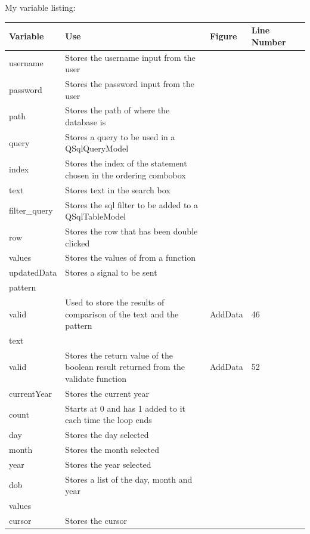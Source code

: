 My variable listing:

\begin{center}
	\begin{tabular}{|p{2cm}|p{2cm}|p{2cm}|p{2cm}|l}
		\hline
		\textbf{Variable}  &  \textbf{Use}  &  \textbf{Figure}  &  \textbf{Line Number} \\ \hline
		username & Stores the username input from the user & & \\ \hline
		password & Stores the password input from the user & & \\ \hline
		path & Stores the path of where the database is & & \\ \hline
		query & Stores a query to be used in a QSqlQueryModel & & \\ \hline
		index & Stores the index of the statement chosen in the ordering combobox & & \\ \hline
		text & Stores text in the search box & & \\ \hline
		filter\_query & Stores the sql filter to be added to a QSqlTableModel & & \\ \hline
		row & Stores the row that has been double clicked & & \\ \hline
		values & Stores the values of from a function & & \\ \hline
		updatedData & Stores a signal to be sent  & & \\ \hline
		pattern & & & \\ \hline
		valid & Used to store the results of comparison of the text and the pattern & AddData & 46 \\ \hline
		text & & & \\ \hline
		valid & Stores the return value of the boolean result returned from the validate function & AddData & 52 \\ \hline
		currentYear & Stores the current year & & \\ \hline
		count & Starts at 0 and has 1 added to it each time the loop ends & & \\ \hline
		day & Stores the day selected & & \\ \hline
		month & Stores the month selected & & \\ \hline
		year & Stores the year selected & & \\ \hline
		dob & Stores a list of the day, month and year & & \\ \hline
		values & & & \\ \hline
		cursor & Stores the cursor & & \\ \hline

\end{tabular}
\end{center}
